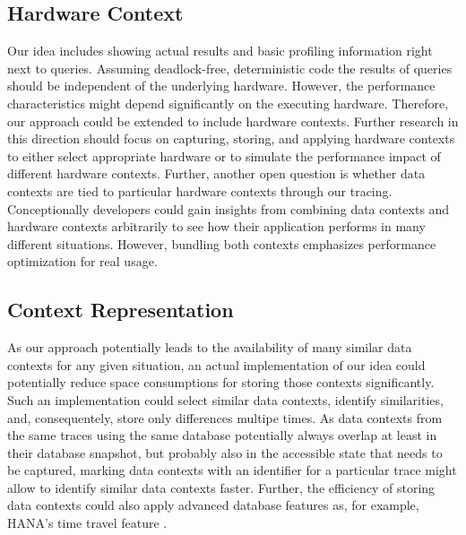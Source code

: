 \subsection{Hardware Context}
Our idea includes showing actual results and basic profiling information right next to queries.
Assuming deadlock-free, deterministic code the results of queries should be independent of the underlying hardware.
However, the performance characteristics might depend significantly on the executing hardware.
Therefore, our approach could be extended to include hardware contexts.
Further research in this direction should focus on capturing, storing, and applying hardware contexts to either select appropriate hardware or to simulate the performance impact of different hardware contexts.
Further, another open question is whether data contexts are tied to particular hardware contexts through our tracing.
Conceptionally developers could gain insights from combining data contexts and hardware contexts arbitrarily to see how their application performs in many different situations.
However, bundling both contexts emphasizes performance optimization for real usage.

\subsection{Context Representation}
As our approach potentially leads to the availability of many similar data contexts for any given situation, an actual implementation of our idea could potentially reduce space consumptions for storing those contexts significantly.
Such an implementation could select similar data contexts, identify similarities, and, consequentely, store only differences multipe times.
As data contexts from the same traces using the same database potentially always overlap at least in their database snapshot, but probably also in the accessible state that needs to be captured, marking data contexts with an identifier for a particular trace might allow to identify similar data contexts faster.
Further, the efficiency of storing data contexts could also apply advanced database features as, for example, HANA's time travel feature .
